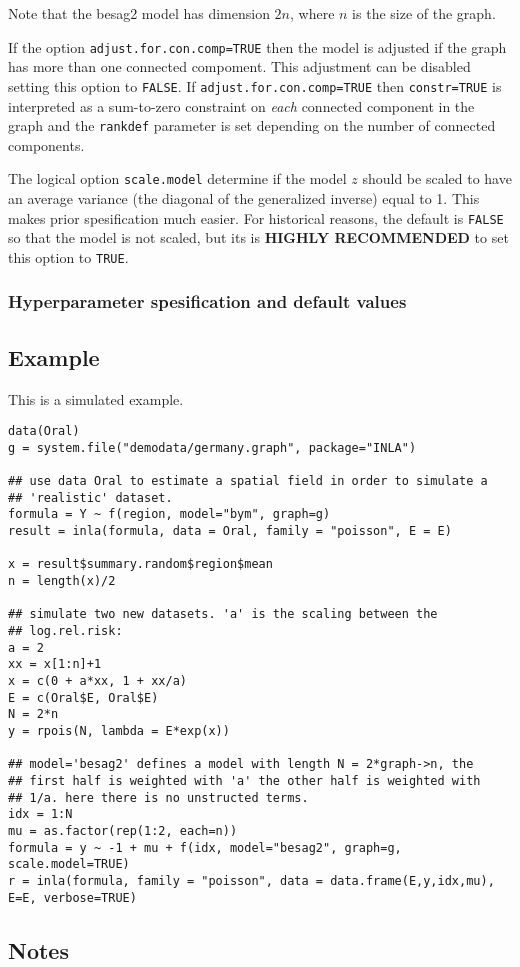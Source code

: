\documentclass[a4paper,11pt]{article}
\begin{document}
Note that the besag2 model has dimension $2 n$, where $n$ is the size
of the graph.

If the option \verb|adjust.for.con.comp=TRUE| then the model is
adjusted if the graph has more than one connected compoment. This
adjustment can be disabled setting this option to \texttt{FALSE}. If
\verb|adjust.for.con.comp=TRUE| then \texttt{constr=TRUE} is
interpreted as a sum-to-zero constraint on \emph{each} connected
component in the graph and the \texttt{rankdef} parameter is set
depending on the number of connected components.

The logical option \verb|scale.model| determine if the model $z$
should be scaled to have an average variance (the diagonal of the
generalized inverse) equal to 1. This makes prior spesification much
easier. For historical reasons, the default is \verb|FALSE| so that
the model is not scaled, but its is \textbf{HIGHLY RECOMMENDED} to set
this option to \verb|TRUE|.



\subsubsection*{Hyperparameter spesification and default values}




\subsection*{Example}

This is a simulated example.

\begin{verbatim}
data(Oral)
g = system.file("demodata/germany.graph", package="INLA")

## use data Oral to estimate a spatial field in order to simulate a
## 'realistic' dataset.
formula = Y ~ f(region, model="bym", graph=g)
result = inla(formula, data = Oral, family = "poisson", E = E)

x = result$summary.random$region$mean
n = length(x)/2

## simulate two new datasets. 'a' is the scaling between the
## log.rel.risk:
a = 2
xx = x[1:n]+1
x = c(0 + a*xx, 1 + xx/a)
E = c(Oral$E, Oral$E)
N = 2*n
y = rpois(N, lambda = E*exp(x))

## model='besag2' defines a model with length N = 2*graph->n, the
## first half is weighted with 'a' the other half is weighted with
## 1/a. here there is no unstructed terms.
idx = 1:N
mu = as.factor(rep(1:2, each=n))
formula = y ~ -1 + mu + f(idx, model="besag2", graph=g, scale.model=TRUE)
r = inla(formula, family = "poisson", data = data.frame(E,y,idx,mu), E=E, verbose=TRUE)
\end{verbatim}




\subsection*{Notes}
\end{document}
